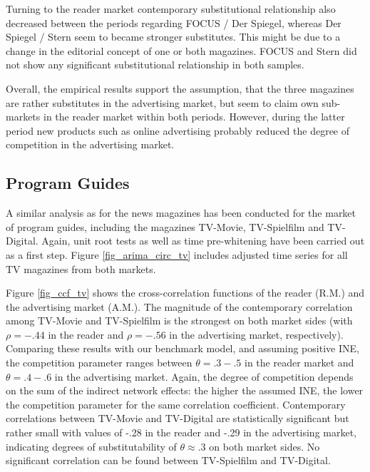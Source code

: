 \documentclass[12pt,a4paper]{scrreprt}
\begin{document}
Turning to the reader market contemporary substitutional relationship also decreased between the periods regarding FOCUS / Der Spiegel, whereas Der Spiegel / Stern seem to became stronger substitutes. This might be due to a change in the editorial concept of one or both magazines. FOCUS and Stern did not show any significant substitutional relationship in both samples.  

Overall, the empirical results support the assumption, that the three magazines are rather substitutes in the advertising market, but seem to claim own sub-markets in the reader market within both periods. However, during the latter period new products such as online advertising probably reduced the degree of competition in the advertising market. 






\subsection{Program Guides}

A similar analysis as for the news magazines has been conducted for the market of program guides, including the magazines TV-Movie, TV-Spielfilm and TV-Digital. 
Again, unit root tests as well as time pre-whitening have been carried out as a first step. Figure \ref{fig_arima_circ_tv} includes adjusted time series for all TV magazines from both markets.  


Figure \ref{fig_ccf_tv} shows the cross-correlation functions of the reader (R.M.) and the advertising market (A.M.). The magnitude of the contemporary correlation among TV-Movie and TV-Spielfilm is the strongest on both market sides (with $\rho=-.44$ in the reader and $\rho=-.56$ in the advertising market, respectively). Comparing these results with our benchmark model, and assuming positive INE, the competition parameter ranges between $\theta=.3-.5$ in the reader market and $\theta=.4-.6$ in the advertising market. Again, the degree of competition depends on the sum of the indirect network effects: the higher the assumed INE, the lower the competition parameter for the same correlation coefficient. Contemporary correlations between TV-Movie and TV-Digital are statistically significant but rather small with values of -.28 in the reader and -.29 in the advertising market, indicating degrees of substitutability of $\theta\approx.3$ on both market sides. No significant correlation can be found between TV-Spielfilm and TV-Digital.
\end{document}
